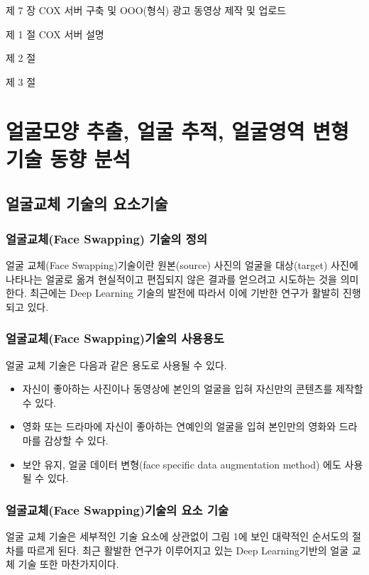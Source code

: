 \documentclass{oblivoir}
\begin{document}
제  7  장 COX 서버 구축 및 OOO(형식) 광고 동영상 제작 및 업로드

  제  1  절 COX 서버 설명

  제  2  절 

  제  3  절 

\chapter{얼굴모양 추출, 얼굴 추적, 얼굴영역 변형 기술 동향 분석 }

\section{얼굴교체 기술의 요소기술}

\subsection{ 얼굴교체(Face Swapping) 기술의 정의}

얼굴 교체(Face Swapping)기술이란 원본(source) 사진의 얼굴을 대상(target) 사진에 나타나는 얼굴로 옮겨 현실적이고 편집되지 않은 결과를 얻으려고 시도하는 것을 의미한다. 최근에는 Deep Learning 기술의 발전에 따라서 이에 기반한 연구가 활발히 진행되고 있다.

\subsection{ 얼굴교체(Face Swapping)기술의 사용용도}

얼굴 교체 기술은 다음과 같은 용도로 사용될 수 있다.

\begin{itemize}
\item 자신이 좋아하는 사진이나 동영상에 본인의 얼굴을 입혀 자신만의 콘텐츠를 제작할 수 있다.
\item 영화 또는 드라마에 자신이 좋아하는 연예인의 얼굴을 입혀 본인만의 영화와 드라마를 감상할 수 있다.
\item 보안 유지, 얼굴 데이터 변형(face specific data augmentation method) 에도 사용될 수 있다.
\end{itemize}

\subsection{ 얼굴교체(Face Swapping)기술의 요소 기술}

얼굴 교체 기술은 세부적인 기술 요소에 상관없이 그림 1에 보인 대략적인 순서도의 절차를 따르게 된다. 최근 활발한 연구가 이루어지고 있는 Deep Learning기반의 얼굴 교체 기술 또한 마찬가지이다. 
\end{document}
